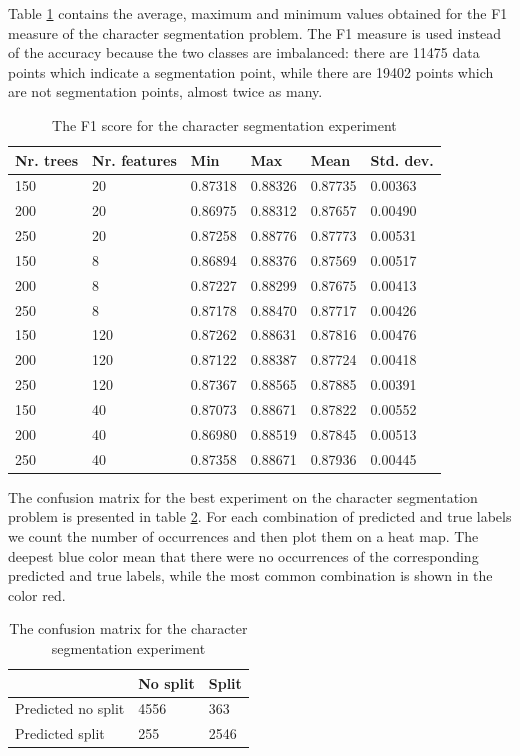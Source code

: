 Table \ref{table:seg_values} contains the average, maximum and minimum values obtained for the F1 measure \cite{fawcett2006introduction} of the character segmentation problem. The F1 measure is used instead of the accuracy because the two classes are imbalanced: there are 11475 data points which indicate a segmentation point, while there are 19402 points which are not segmentation points, almost twice as many. 

\begin{table}[h]
\caption{The F1 score for the character segmentation experiment}
\label{table:seg_values}
\begin{tabular}{llllll}
\toprule
Nr. trees & Nr. features & Min     & Max     & Mean    & Std. dev. \\ 
\midrule
150 & 20 & 0.87318 & 0.88326 & 0.87735 & 0.00363 \\ 
200 & 20 & 0.86975 & 0.88312 & 0.87657 & 0.00490 \\ 
250 & 20 & 0.87258 & 0.88776 & 0.87773 & 0.00531 \\ 
150 & 8 & 0.86894 & 0.88376 & 0.87569 & 0.00517 \\ 
200 & 8 & 0.87227 & 0.88299 & 0.87675 & 0.00413 \\ 
250 & 8 & 0.87178 & 0.88470 & 0.87717 & 0.00426 \\ 
150 & 120 & 0.87262 & 0.88631 & 0.87816 & 0.00476 \\ 
200 & 120 & 0.87122 & 0.88387 & 0.87724 & 0.00418 \\ 
250 & 120 & 0.87367 & 0.88565 & 0.87885 & 0.00391 \\ 
150 & 40 & 0.87073 & 0.88671 & 0.87822 & 0.00552 \\ 
200 & 40 & 0.86980 & 0.88519 & 0.87845 & 0.00513 \\ 
250 & 40 & 0.87358 & 0.88671 & 0.87936 & 0.00445 \\ 
\bottomrule
\end{tabular}
\end{table}

The confusion matrix for the best experiment on the character segmentation problem is presented in table \ref{table:seg_conf}. For each combination of predicted and true labels we count the number of occurrences and then plot them on a heat map. The deepest blue color mean that there were no occurrences of the corresponding predicted and true labels, while the most common combination is shown in the color red. 

\begin{table}[h]
\caption{The confusion matrix for the character segmentation experiment}
\label{table:seg_conf}
\begin{tabular}{lll}
\hline
 & No split & Split \\ \hline
Predicted no split & 4556 & 363 \\ 
Predicted split & 255 & 2546 \\  \hline
\end{tabular}
\end{table}


